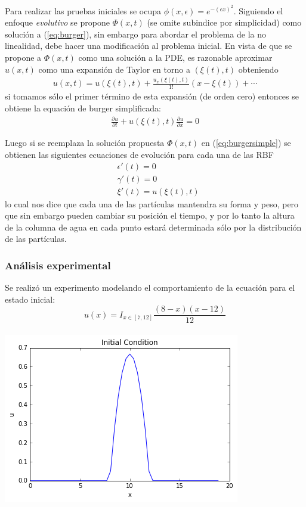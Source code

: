 \documentclass[spanish, fleqn]{article}
\begin{document}
    Para realizar las pruebas iniciales se ocupa $\displaystyle \phi(x,\epsilon) = e^{-(\epsilon x)^2}$. Siguiendo el enfoque \textit{evolutivo} se propone $\Phi(x,t)$ (se omite subindice por simplicidad) como solución a (\ref{eq:burger}), sin embargo para abordar el problema de la no linealidad, debe hacer una modificación al problema inicial. En vista de que se propone a $\Phi(x,t)$ como una solución a la PDE, es razonable aproximar $u(x,t)$ como una expansión de Taylor en torno a $(\xi(t),t)$ obteniendo
    \begin{align}
      u(x,t) = u(\xi(t),t) + \frac{u_x(\xi(t),t)}{1!}(x-\xi(t)) + \cdots
    \end{align}
    si tomamos sólo el primer término de esta expansión (de orden cero) entonces se obtiene la equación de burger simplificada:
    \begin{align}
      \frac{\partial u}{\partial t} + u(\xi(t),t)\frac{\partial u}{\partial x} = 0
      \label{eq:burgersimple}
    \end{align}

    Luego si se reemplaza la solución propuesta $\Phi(x,t)$ en (\ref{eq:burgersimple}) se obtienen las siguientes ecuaciones de evolución para cada una de las RBF
    \begin{align*}
    & \epsilon'(t) = 0 \\
    & \gamma'(t) = 0  \\
    & \xi'(t) = u(\xi(t),t) 
    \end{align*}
    lo cual nos dice que cada una de las partículas mantendra su forma y peso, pero que sin embargo pueden cambiar su posición el tiempo, y por lo tanto la altura de la columna de agua en cada punto estará determinada sólo por la distribución de las partículas.


    \subsubsection{Análisis experimental}
    Se realizó un experimento modelando el comportamiento de la ecuación para el estado inicial:
    \begin{equation*}
      u(x) = I_{x \in [7,12]}\frac{(8-x)(x-12)}{12}
    \end{equation*} \\
    \includegraphics[scale=0.6]{initialu.png} \\
\end{document}
